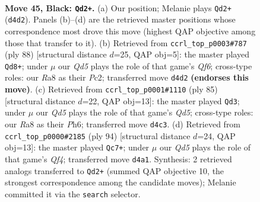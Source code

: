 \documentclass[11pt]{article}
\begin{document}
\clearpage

\begin{figure}[p]\centering
\begin{subfigure}{0.46\textwidth}\centering
\resizebox{\linewidth}{!}{%
\newchessgame
\chessboard[
  setfen={r7/1Q6/4kp2/3p4/3q1P2/p5P1/P5KP/8 b - - 10 45},
  showmover=false,
  pgfstyle=straightmove, color=movearrow, markmove={d4-d2}
]}
\caption{}
\end{subfigure}\hfill
\begin{subfigure}{0.46\textwidth}\centering
\resizebox{\linewidth}{!}{%
\newchessgame
\chessboard[
  setfen={1k6/1pp5/p2p1Q2/P4P2/4q3/1P6/1KP5/8 w - - 1 45},
  showmover=false,
  pgfstyle=straightmove, color=movearrow, markmove={f6-d8}
]}
\caption{}
\end{subfigure}
\\[4pt]
\begin{subfigure}{0.46\textwidth}\centering
\resizebox{\linewidth}{!}{%
\newchessgame
\chessboard[
  setfen={8/6pk/4Q2p/3p4/3q3P/6P1/5PK1/8 b - - 0 43},
  showmover=false,
  pgfstyle=straightmove, color=movearrow, markmove={d4-d3}
]}
\caption{}
\end{subfigure}\hfill
\begin{subfigure}{0.46\textwidth}\centering
\resizebox{\linewidth}{!}{%
\newchessgame
\chessboard[
  setfen={8/4kpp1/4p2p/7P/3P1Q2/3K1P2/6q1/8 w - - 14 48},
  showmover=false,
  pgfstyle=straightmove, color=movearrow, markmove={f4-c7}
]}
\caption{}
\end{subfigure}
\caption{\textbf{Move 45, Black: \texttt{Qd2+}.} (a) Our position; Melanie plays \texttt{Qd2+} (\texttt{d4d2}). Panels (b)--(d) are the retrieved master positions whose correspondence most drove this move (highest QAP objective among those that transfer to it). (b) Retrieved from \texttt{ccrl\_top\_p0003\#787} (ply 88) [structural distance $d$=25, QAP obj=5]: the master played \texttt{Qd8+}; under $\mu$ our \emph{Qd5} plays the role of that game's \emph{Qf6}; cross-type roles: our \emph{R}a8 as their \emph{P}c2; transferred move \texttt{d4d2} \textbf{(endorses this move)}. (c) Retrieved from \texttt{ccrl\_top\_p0001\#1110} (ply 85) [structural distance $d$=22, QAP obj=13]: the master played \texttt{Qd3}; under $\mu$ our \emph{Qd5} plays the role of that game's \emph{Qd5}; cross-type roles: our \emph{R}a8 as their \emph{P}h6; transferred move \texttt{d4c3}. (d) Retrieved from \texttt{ccrl\_top\_p0000\#2185} (ply 94) [structural distance $d$=24, QAP obj=13]: the master played \texttt{Qc7+}; under $\mu$ our \emph{Qd5} plays the role of that game's \emph{Qf4}; transferred move \texttt{d4a1}. Synthesis: 2 retrieved analogs transferred to \texttt{Qd2+} (summed QAP objective 10, the strongest correspondence among the candidate moves); Melanie committed it via the \texttt{search} selector.}
\label{fig:thought-m89}
\end{figure}
\end{document}
